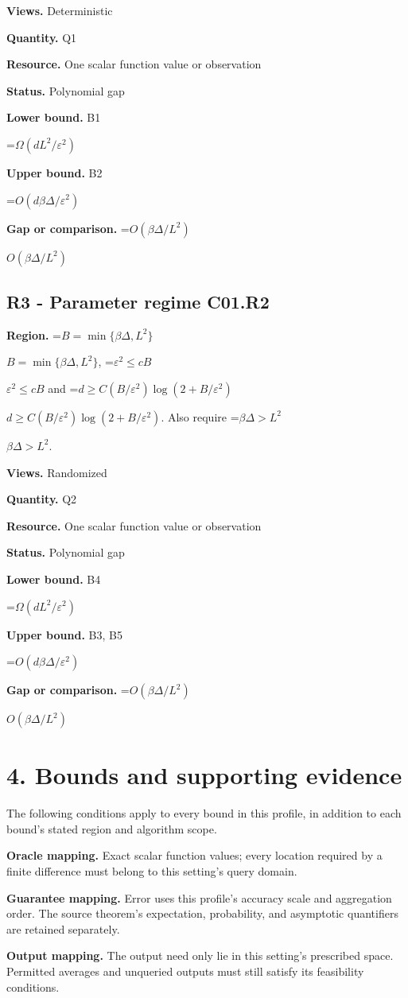 \documentclass[10pt,a4paper]{article}
\newcommand{\AtlasMath}[1]{\par\begingroup\centering\setbox0=\hbox{$\displaystyle #1$}\ifdim\wd0>1.4\linewidth\typeout{ATLAS WIDE FORMULA: \the\wd0}\fi\ifdim\wd0>\linewidth\resizebox{\linewidth}{!}{\box0}\else\box0\fi\par\endgroup}
\newcommand{\AtlasInlineMath}[1]{\begingroup\setbox0=\hbox{$#1$}\ifdim\wd0>.4\linewidth\endgroup\AtlasMath{#1}\else\endgroup$#1$\fi}
\begin{document}
\textbf{Views.} Deterministic

\textbf{Quantity.} Q1

\textbf{Resource.} One scalar function value or observation

\textbf{Status.} Polynomial gap

\textbf{Lower bound.} B1

\AtlasMath{\Omega(dL^2/\varepsilon^2)}
\textbf{Upper bound.} B2

\AtlasMath{O(d\beta\Delta/\varepsilon^2)}
\textbf{Gap or comparison.} \AtlasInlineMath{O(\beta\Delta/L^2)}

\subsection{R3 - Parameter regime C01.R2}
\textbf{Region.} \AtlasInlineMath{B=\min\{\beta\Delta,L^2\}}, \AtlasInlineMath{\varepsilon^2\le cB} and \AtlasInlineMath{d\ge C(B/\varepsilon^2)\log(2+B/\varepsilon^2)}. Also require \AtlasInlineMath{\beta\Delta>L^2}.

\textbf{Views.} Randomized

\textbf{Quantity.} Q2

\textbf{Resource.} One scalar function value or observation

\textbf{Status.} Polynomial gap

\textbf{Lower bound.} B4

\AtlasMath{\Omega(dL^2/\varepsilon^2)}
\textbf{Upper bound.} B3, B5

\AtlasMath{O(d\beta\Delta/\varepsilon^2)}
\textbf{Gap or comparison.} \AtlasInlineMath{O(\beta\Delta/L^2)}

\section{4. Bounds and supporting evidence}
The following conditions apply to every bound in this profile, in addition to each bound's stated region and algorithm scope.

\textbf{Oracle mapping.} Exact scalar function values; every location required by a finite difference must belong to this setting's query domain.

\textbf{Guarantee mapping.} Error uses this profile's accuracy scale and aggregation order. The source theorem's expectation, probability, and asymptotic quantifiers are retained separately.

\textbf{Output mapping.} The output need only lie in this setting's prescribed space. Permitted averages and unqueried outputs must still satisfy its feasibility conditions.
\end{document}

